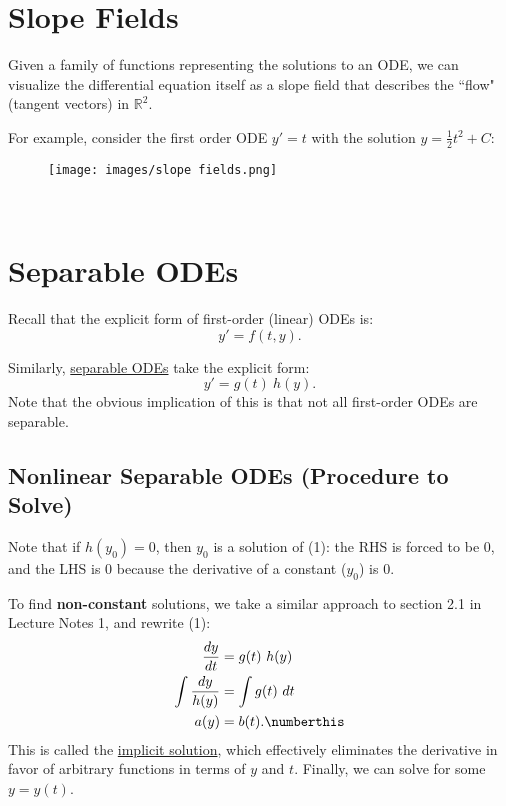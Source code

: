 \documentclass{article}
\begin{document}


\section{Slope Fields}

Given a family of functions representing the solutions to an ODE, we can visualize the differential equation itself as a slope field that describes the ``flow" (tangent vectors) in $\mathbb{R}^{2}$. 


For example, consider the first order ODE $y'=t$ with the solution $y=\tfrac{1}{2} t^{2} +C$:

\begin{figure}[htp]
    \centering
    \texttt{[image: images/slope fields.png]}
\end{figure}

\
\hline
\section{Separable ODEs}

Recall that the explicit form of first-order (linear) ODEs is:
\begin{equation*}
y'=f( t,y) .
\end{equation*}


Similarly, \underline{separable ODEs} take the explicit form:
\begin{equation}
\boxed{y'=g( t) \ h( y)} .
\end{equation}
Note that the obvious implication of this is that not all first-order ODEs are separable.


\subsection{Nonlinear Separable ODEs (Procedure to Solve)}

Note that if $h( y_{0}) =0$, then $y_{0}$ is a solution of (1): the RHS is forced to be 0, and the LHS is 0 because the derivative of a constant ($y_{0}$) is 0. 



To find \textbf{non-constant} solutions, we take a similar approach to section 2.1 in Lecture Notes 1, and rewrite (1):
\begin{align*}
\frac{dy}{dt} & =g( t) \ h( y)\\
\int \frac{dy}{h( y)} & =\int g( t) \ dt\\
a( y) & =b( t) . \numberthis
\end{align*}
This is called the \underline{implicit solution}, which effectively eliminates the derivative in favor of arbitrary functions in terms of $y$ and $t$. Finally, we can solve for some $y=y( t)$.
\end{document}
